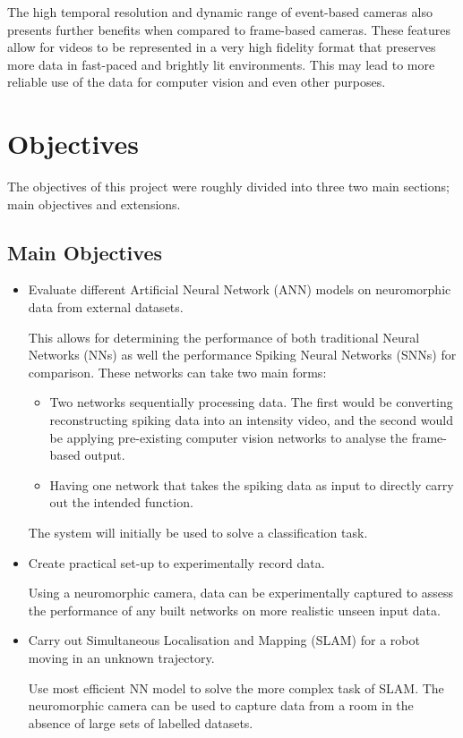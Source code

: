 The high temporal resolution and dynamic range of event-based cameras also presents further benefits when compared to frame-based cameras. These features allow for videos to be represented in a very high fidelity format that preserves more data in fast-paced and brightly lit environments. This may lead to more reliable use of the data for computer vision and even other purposes.

\section{Objectives}

The objectives of this project were roughly divided into three two main sections; main objectives and extensions.

\subsection{Main Objectives}

\begin{itemize}
    \item Evaluate different Artificial Neural Network (ANN) models on neuromorphic data from external datasets.

          This allows for determining the performance of both traditional Neural Networks (NNs) as well the performance Spiking Neural Networks (SNNs) for comparison. These networks can take two main forms:
          \begin{itemize}
              \item Two networks sequentially processing data. The first would be converting reconstructing spiking data into an intensity video, and the second would be applying pre-existing computer vision networks to analyse the frame-based output.
              \item Having one network that takes the spiking data as input to directly carry out the intended function.
          \end{itemize}
          The system will initially be used to solve a classification task.
    \item Create practical set-up to experimentally record data.

          Using a neuromorphic camera, data can be experimentally captured to assess the performance of any built networks on more realistic unseen input data.
    \item Carry out Simultaneous Localisation and Mapping (SLAM) for a robot moving in an unknown trajectory.

          Use most efficient NN model to solve the more complex task of SLAM. The neuromorphic camera can be used to capture data from a room in the absence of large sets of labelled datasets.
\end{itemize}

